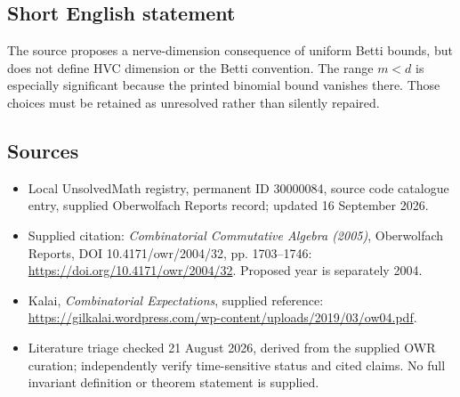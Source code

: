\documentclass[11pt]{article}
\begin{document}
\subsection{Short English statement}
The source proposes a nerve-dimension consequence of uniform Betti bounds, but does not define HVC dimension or the Betti convention. The range $m<d$ is especially significant because the printed binomial bound vanishes there. Those choices must be retained as unresolved rather than silently repaired.
\subsection{Sources}
\begin{itemize}
\item Local UnsolvedMath registry, permanent ID 30000084, source code catalogue entry, supplied Oberwolfach Reports record; updated 16 September 2026.
\item Supplied citation: \emph{Combinatorial Commutative Algebra (2005)}, Oberwolfach Reports, DOI 10.4171/owr/2004/32, pp. 1703--1746: \url{https://doi.org/10.4171/owr/2004/32}. Proposed year is separately 2004.
\item Kalai, \emph{Combinatorial Expectations}, supplied reference: \url{https://gilkalai.wordpress.com/wp-content/uploads/2019/03/ow04.pdf}.
\item Literature triage checked 21 August 2026, derived from the supplied OWR curation; independently verify time-sensitive status and cited claims. No full invariant definition or theorem statement is supplied.
\end{itemize}
\end{document}
